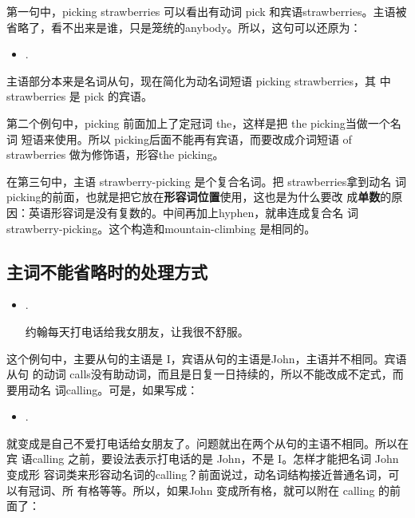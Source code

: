 第一句中，picking strawberries 可以看出有动词 pick 和宾语strawberries。主语被
省略了，看不出来是谁，只是笼统的anybody。所以，这句可以还原为：

\begin{itemize}
\item  {}  .
\end{itemize}

主语部分本来是名词从句，现在简化为动名词短语 picking strawberries，其
中strawberries 是 pick 的宾语。

第二个例句中，picking 前面加上了定冠词 the，这样是把 the picking当做一个名词
短语来使用。所以 picking后面不能再有宾语，而要改成介词短语 of strawberries
做为修饰语，形容the picking。

在第三句中，主语 strawberry-picking 是个复合名词。把 strawberries拿到动名
词 picking的前面，也就是把它放在\textbf{形容词位置}使用，这也是为什么要改
成\textbf{单数}的原因：英语形容词是没有复数的。中间再加上hyphen，就串连成复合名
词 strawberry-picking。这个构造和mountain-climbing 是相同的。

\subsection{主词不能省略时的处理方式}

\begin{itemize}
\item {}  .

约翰每天打电话给我女朋友，让我很不舒服。
\end{itemize}

这个例句中，主要从句的主语是 I，宾语从句的主语是John，主语并不相同。宾语从句
的动词 calls没有助动词，而且是日复一日持续的，所以不能改成不定式，而要用动名
词calling。可是，如果写成：

\begin{itemize}
\item {}  .
\end{itemize}

就变成是自己不爱打电话给女朋友了。问题就出在两个从句的主语不相同。所以在宾
语calling 之前，要设法表示打电话的是 John，不是 I。怎样才能把名词 John变成形
容词类来形容动名词的calling？前面说过，动名词结构接近普通名词，可以有冠词、所
有格等等。所以，如果John 变成所有格，就可以附在 calling 的前面了：


